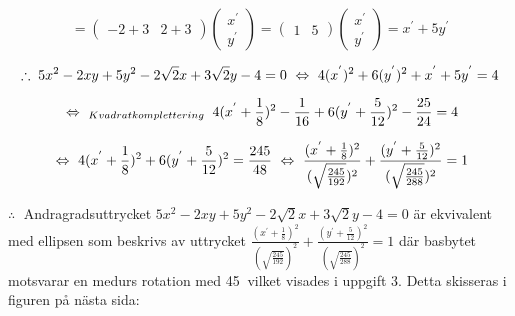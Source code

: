 \documentclass{article}
\begin{document}
$$
=
\begin{pmatrix}
    -2+3 & 2+3
\end{pmatrix}
\begin{pmatrix}
    x^{'} \\
    y^{'}
\end{pmatrix}
=
\begin{pmatrix}
    1 & 5 
\end{pmatrix}
\begin{pmatrix}
    x^{'} \\
    y^{'}
\end{pmatrix}
=
x^{'}+5y^{'}
$$

\vskip 0.3cm

$$
\therefore
\;
5x^2-2xy+5y^2-2\sqrt{2}x+3\sqrt{2}y-4=0 
\ \Leftrightarrow \ 
4(x^{'})^2+6(y^{'})^2+x^{'}+5y^{'}=4
$$

$$
\ \Leftrightarrow \ _{Kvadratkomplettering}
\;\;
4(x^{'}+\frac{1}{8})^2-\frac{1}{16}+6(y^{'}+\frac{5}{12})^2-\frac{25}{24}=4
$$

$$
\ \Leftrightarrow \ 
4(x^{'}+\frac{1}{8})^2+6(y^{'}+\frac{5}{12})^2=\frac{245}{48}
\ \Leftrightarrow \ 
\frac{(x^{'}+\frac{1}{8})^2}{(\sqrt{\frac{245}{192}})^2}+\frac{(y^{'}+\frac{5}{12})^2}{(\sqrt{\frac{245}{288}})^2}=1
$$

\vskip 0.3cm

$\therefore \;$ Andragradsuttrycket $5x^2-2xy+5y^2-2\sqrt{2}x+3\sqrt{2}y-4=0$ är ekvivalent med ellipsen som beskrivs av uttrycket $\frac{(x^{'}+\frac{1}{8})^2}{(\sqrt{\frac{245}{192}})^2}+\frac{(y^{'}+\frac{5}{12})^2}{(\sqrt{\frac{245}{288}})^2}=1$ där basbytet motsvarar en medurs rotation med 45\textdegree $\:$ vilket visades i uppgift 3. Detta skisseras i figuren på nästa sida:

\newpage
\end{document}
